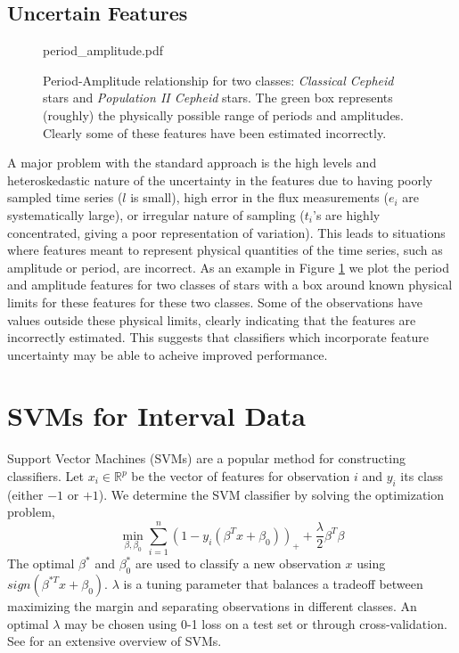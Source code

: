\documentclass[10pt]{article}
\theoremstyle{definition}
\begin{document}
\subsection{Uncertain Features}
\begin{figure}[h]
  \begin{center}
    \begin{includegraphics}[scale=.5]{period_amplitude.pdf}
      \caption{Period-Amplitude relationship for two classes: \textit{Classical Cepheid} stars and \textit{Population II Cepheid} stars. The green box represents (roughly) the physically possible range of periods and amplitudes. Clearly some of these features have been estimated incorrectly.\label{fig:period_amplitude}}
    \end{includegraphics}
  \end{center}
\end{figure}
A major problem with the standard approach is the high levels and heteroskedastic nature of the uncertainty in the features due to having poorly sampled time series ($l$ is small), high error in the flux measurements ($e_{i}$ are systematically large), or irregular nature of sampling ($t_i$'s are highly concentrated, giving a poor representation of variation). This leads to situations where features meant to represent physical quantities of the time series, such as amplitude or period, are incorrect. As an example in Figure \ref{fig:period_amplitude} we plot the period and amplitude features for two classes of stars with a box around known physical limits for these features for these two classes. Some of the observations have values outside these physical limits, clearly indicating that the features are incorrectly estimated. This suggests that classifiers which incorporate feature uncertainty may be able to acheive improved performance.


\section{SVMs for Interval Data}
Support Vector Machines (SVMs) are a popular method for constructing classifiers. Let $x_i \in \mathbb{R}^p$ be the vector of features for observation $i$ and $y_i$ its class (either $-1$ or $+1$). We determine the SVM classifier by solving the optimization problem,
\begin{equation}
\label{eq:svm}
\min_{\beta,\beta_0}  \sum_{i=1}^n (1 - y_i(\beta^Tx + \beta_0))_{+} + \frac{\lambda}{2}\beta^T\beta
\end{equation}
The optimal $\beta^{*}$ and $\beta_0^*$ are used to classify a new observation $x$ using $sign(\beta^{*T}x + \beta_0)$. $\lambda$ is a tuning parameter that balances a tradeoff between maximizing the margin and separating observations in different classes. An optimal $\lambda$ may be chosen using 0-1 loss on a test set or through cross-validation. See \cite{scholkopf2002learning} for an extensive overview of SVMs.
\end{document}
